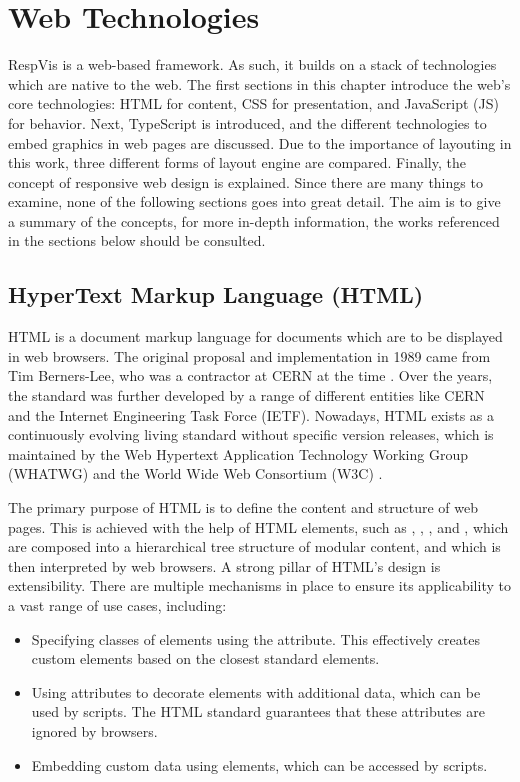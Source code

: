 
\chapter{Web Technologies}
\label{chap:WebTechnologies}

RespVis is a web-based framework. As such, it builds on a stack of
technologies which are native to the web. The first sections in this
chapter introduce the web's core technologies: HTML for content, CSS
for presentation, and JavaScript (JS) for behavior. Next, TypeScript
is introduced, and the different technologies to embed graphics in web
pages are discussed. Due to the importance of layouting in this work,
three different forms of layout engine are compared. Finally, the
concept of responsive web design is explained. Since there are many
things to examine, none of the following sections goes into great
detail. The aim is to give a summary of the concepts, for more
in-depth information, the works referenced in the sections below
should be consulted.


\section{HyperText Markup Language (HTML)}
\label{sec:HTML}

HTML is a document markup language for documents which are to be
displayed in web browsers. The original proposal and implementation in
1989 came from Tim Berners-Lee, who was a contractor at CERN at the
time \parencite{TBLProposal}. Over the years, the standard was further
developed by a range of different entities like CERN and the
Internet Engineering Task Force (IETF). Nowadays, HTML exists as a
continuously evolving living standard without specific version
releases, which is maintained by the Web Hypertext Application
Technology Working Group (WHATWG) and the World Wide Web Consortium
(W3C) \parencite{HTML}.

The primary purpose of HTML is to define the content and structure of
web pages. This is achieved with the help of HTML elements, such as
, , , and ,
which are composed into a hierarchical tree structure of modular
content, and which is then interpreted by web browsers. A strong
pillar of HTML's design is extensibility. There are multiple
mechanisms in place to ensure its applicability to a vast range of use
cases, including:
\begin{itemize}
\item Specifying classes of elements using the 
  attribute. This effectively creates custom elements based on the
  closest standard elements.

\item Using  attributes to decorate elements with
  additional data, which can be used by scripts. The HTML standard
  guarantees that these attributes are ignored by browsers.

\item Embedding custom data using  elements,
  which can be accessed by scripts.
\end{itemize}





